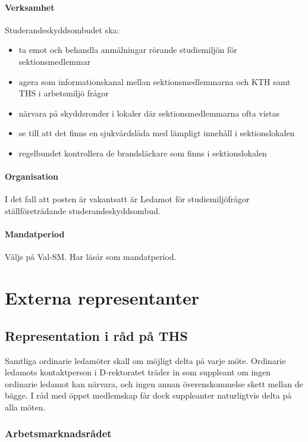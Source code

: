 \documentclass{dgovdoc}
\begin{document}
\paragraph{Verksamhet}
Studerandeskyddsombudet ska:
\begin{itemize}
    \item ta emot och behandla anmälningar rörande studiemiljön för sektionsmedlemmar
    \item agera som informationskanal mellan sektionsmedlemmarna och KTH samt THS i arbetsmiljö frågor
    \item närvara på skyddsronder i lokaler där sektionsmedlemmarna ofta vistas
    \item se till att det finns en sjukvårdslåda med lämpligt innehåll i sektionslokalen
    \item regelbundet kontrollera de brandsläckare som finns i sektionslokalen
\end{itemize}

\paragraph{Organisation}
I det fall att posten är vakantsatt är Ledamot för studiemiljöfrågor ställföreträdande studerandeskyddsombud.

\paragraph{Mandatperiod}
Väljs på Val-SM. Har läsår som mandatperiod.

\section{Externa representanter}

\subsection{Representation i råd på THS}

Samtliga ordinarie ledamöter skall om möjligt delta på varje möte. Ordinarie
ledamots kontaktperson i D-rektoratet träder in som suppleant om ingen
ordinarie ledamot kan närvara, och ingen annan överenskommelse skett mellan de
bägge. I råd med öppet medlemskap får dock suppleanter naturligtvis delta på
alla möten.

\subsubsection{Arbetsmarknadsrådet}
\end{document}

